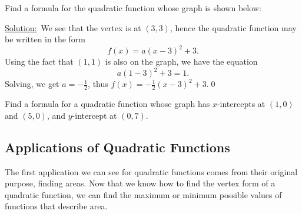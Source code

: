 \begin{eg} Find a formula for the quadratic function whose graph is shown below:

\begin{figure}[h]
\centering
{} 
\end{figure}

\underline{Solution:}\ \normalfont We see that the vertex is at $(3,3)$, hence the quadratic function may be written in the form 
\[
f(x) = a(x-3)^2 + 3.
\]
Using the fact that $(1,1)$ is also on the graph, we have the equation
\[
a(1-3)^2 + 3 = 1.
\]
Solving, we get $a= -\frac{1}{2}$, thus $f(x) = -\frac{1}{2}(x-3)^2 + 3$.\qed \end{eg}

\par

\begin{question} Find a formula for a quadratic function whose graph has $x$-intercepts at $(1,0)$ and $(5,0)$, and $y$-intercept at $(0,7)$.  
\end{question}

\subsection{Applications of Quadratic Functions}

The first application we can see for quadratic functions comes from their original purpose, finding areas. Now that we know how to find the vertex form of a quadratic function, we can find the maximum or minimum possible values of functions that describe area.

\par


